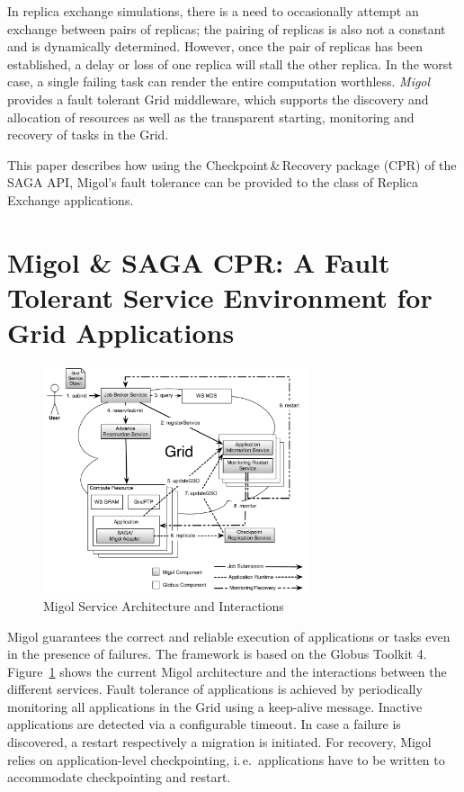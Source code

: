 \documentclass[a4paper,10pt]{article}
\begin{document}
In replica exchange simulations, there is a need to occasionally attempt an exchange
between pairs of replicas; the pairing of replicas is also not a
constant and is dynamically determined. However, once the pair of
replicas has been established, a delay or loss of one replica will
stall the other replica. In the worst case, a single failing task can
render the entire computation worthless.
\emph{Migol}~\cite{schnorLuckow08} provides a fault tolerant Grid
middleware, which supports the discovery and allocation of resources
as well as the transparent starting, monitoring and recovery of tasks in the Grid.

This paper describes how using the Checkpoint\,\&\,Recovery package
(CPR) of the SAGA API, Migol's fault tolerance can be provided to the
class of Replica Exchange applications.

\section*{Migol \& SAGA CPR: A Fault Tolerant Service Environment for
  Grid Applications}
\label{sec:migol}
\begin{figure}[t]
            \centering
                \includegraphics[width=0.7\textwidth]{migol_architecture}
            \caption{Migol Service Architecture and Interactions}
            \label{fig:migol_architecture}
\end{figure}           

Migol guarantees the correct and reliable exe\-cution of applications or tasks even in
the presence of  failures. The framework is based on the Globus Toolkit 4. 
Figure~\ref{fig:migol_architecture} shows the current Migol architecture and 
the interactions between the different services.    
Fault tolerance of applications is achieved by periodically monitoring all applications 
in the Grid using a keep-alive message. Inactive applications are detected via a configurable timeout. In case a failure 
is discovered, a restart respectively a migration is initiated.  For recovery, Migol relies on application-level 
checkpointing, i.\,e.\ applications have to be
written to accommodate checkpointing and restart.    
\end{document}

